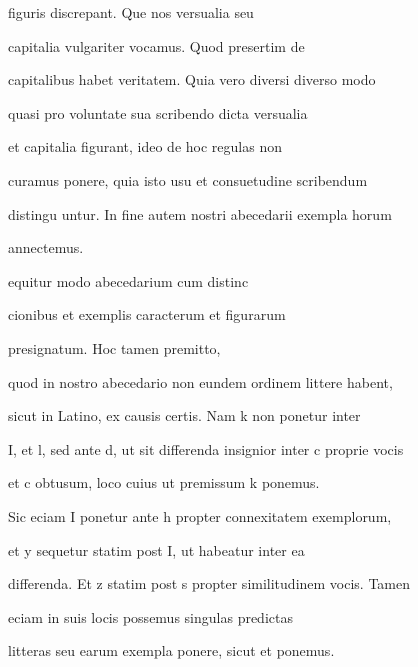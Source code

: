 figuris discrepant. Que nos versualia seu 

capitalia vulgariter vocamus. Quod presertim de 

capitalibus habet veritatem. Quia vero diversi diverso modo 

quasi pro voluntate sua scribendo dicta versualia 

et capitalia figurant, ideo de hoc regulas non 

curamus ponere, quia isto usu et consuetudine scribendum 

distingu untur. In fine autem nostri abecedarii exempla horum 

annectemus. 

\indentP {}equitur modo abecedarium cum distinc

cionibus et exemplis caracterum et figurarum 

presignatum. Hoc tamen premitto, 

quod in nostro abecedario non eundem ordinem littere habent, 

sicut in Latino, ex causis certis. Nam k non ponetur inter 

I, et l, sed ante d, ut sit differenda insignior inter c proprie vocis 

et c obtusum, loco cuius ut premissum k ponemus. 

Sic eciam I ponetur ante h propter connexitatem exemplorum, 

et y sequetur statim post I, ut habeatur inter ea 

 differenda. Et z statim post s propter similitudinem vocis. Tamen 

eciam in suis locis possemus singulas predictas 

\newpage






\fullpreviouslines


{
\color{blue}

litteras seu earum exempla ponere, sicut et
ponemus. 


}




\endinput








\catcode `\^^M=5

